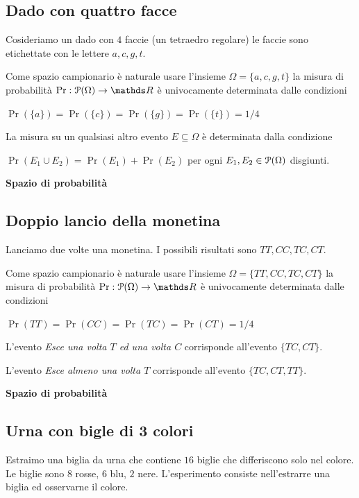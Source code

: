 \documentclass[11pt,openany]{book}
\def\RR{\mathds R}
\def\P{\EuScript P}
\begin{document}
\subsection{Dado con quattro facce}
\label{tetraedro}

Cosideriamo un dado con $4$ faccie (un tetraedro regolare) le faccie sono etichettate con le lettere $a, c, g, t$. 

Come spazio campionario è naturale usare l'insieme $\Omega=\{a, c, g, t\}$ la misura di probabilità $\Pr:\P(\Omega)\to\RR$ è univocamente determinata dalle condizioni

$\Pr(\{a\})=\Pr(\{c\})=\Pr(\{g\})=\Pr(\{t\})=1/4$

La misura su un qualsiasi altro evento $E\subseteq\Omega$ è determinata dalla condizione 

$\Pr(E_1\cup E_2)=\Pr(E_1)+\Pr(E_2)$ per ogni $E_1,E_2\in\P(\Omega)$ disgiunti.



\hfill{}\clearpage\hfill\textbf{Spazio di probabilità}
\subsection{Doppio lancio della monetina}
\label{doppo_lancio_moneta}

Lanciamo due volte una monetina. I possibili risultati sono $TT, CC, TC, CT$. 

Come spazio campionario è naturale usare l'insieme $\Omega=\{TT, CC, TC, CT\}$ la misura di probabilità $\Pr:\P(\Omega)\to\RR$ è univocamente determinata dalle condizioni

$\Pr(TT)=\Pr(CC)=\Pr(TC)=\Pr(CT)=1/4$

L'evento \textit{Esce una volta $T$ ed una volta $C$\/} corrisponde all'evento $\{TC, CT\}$.

L'evento \textit{Esce almeno una volta $T$\/} corrisponde all'evento $\{TC, CT, TT\}$.



\hfill{}\clearpage\hfill\textbf{Spazio di probabilità}
\subsection{Urna con bigle di 3 colori}
\label{urna_3_colori}

Estraimo una biglia da urna che contiene $16$ biglie che differiscono solo nel colore.
Le biglie sono $8$ rosse, $6$ blu, $2$ nere.
L'esperimento consiste nell'estrarre una biglia ed osservarne il colore.
\end{document}
